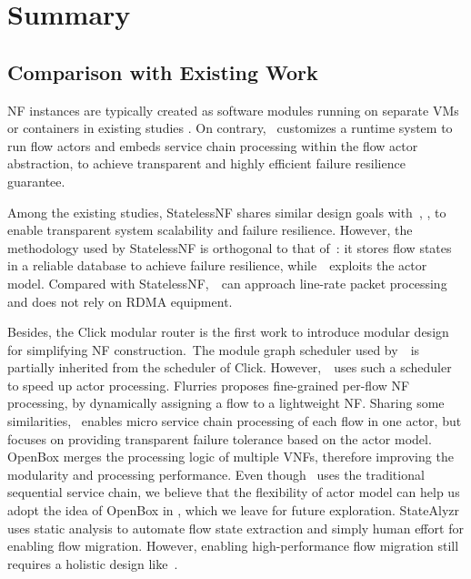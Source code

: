 \section{Summary}
\label{sec:nfvactor-conclusion}

\subsection{Comparison with Existing Work}
\label{sec:nfvactor-related-work}

NF instances are typically created as software modules running on separate VMs or containers in existing studies \cite{gember2012stratos, palkar2015e2, rajagopalan2013split, khalid2016paving, gember2015opennf}. On contrary, \nfactor~customizes a runtime system to run flow actors and embeds service chain processing within the flow actor abstraction, to achieve transparent and highly efficient failure resilience guarantee.


Among the existing studies, StatelessNF \cite{201545} shares similar design goals with~\nfactor, \ie, to enable transparent system scalability and failure resilience. However, the methodology used by StatelessNF is orthogonal to that of~\nfactor: it stores flow states in a reliable database \cite{ongaro2011fast} to achieve failure resilience, while~\nfactor~exploits the actor model. Compared with StatelessNF,~\nfactor~can approach line-rate packet processing and does not rely on RDMA equipment.

Besides, the Click modular router \cite{kohler2000click} is the first work to introduce modular design for simplifying NF construction.~The module graph scheduler used by~\nfactor~is partially inherited from the scheduler of Click. However,~\nfactor~uses such a scheduler to speed up actor processing. Flurries \cite{zhang2016flurries} proposes fine-grained per-flow NF processing, by dynamically assigning a flow to a lightweight NF. Sharing some similarities, \nfactor~enables micro service chain processing of each flow in one actor, but focuses on providing transparent failure tolerance based on the actor model. OpenBox \cite{OpenBox} merges the processing logic of multiple VNFs, therefore improving the modularity and processing performance. Even though \nfactor~uses the traditional sequential service chain, we believe that the flexibility of actor model can help us adopt the idea of OpenBox in \nfactor, which we leave for future exploration. StateAlyzr \cite{khalid2016paving} uses static analysis to automate flow state extraction and simply human effort for enabling flow migration. However, enabling high-performance flow migration still requires a holistic design like~\nfactor.

